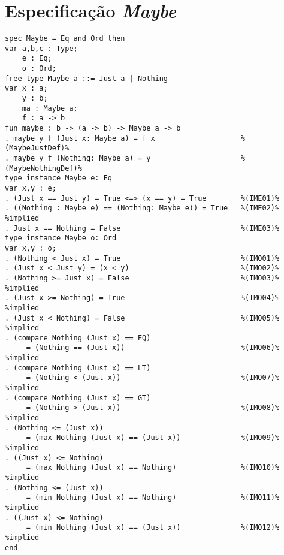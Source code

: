 \section{Especificação \textit{Maybe}}
\label{appendix:strictSpec:maybe}
\begin{Verbatim}
spec Maybe = Eq and Ord then
var a,b,c : Type;
    e : Eq;
    o : Ord;
free type Maybe a ::= Just a | Nothing
var x : a;
    y : b;
    ma : Maybe a;
    f : a -> b
fun maybe : b -> (a -> b) -> Maybe a -> b
. maybe y f (Just x: Maybe a) = f x                    %(MaybeJustDef)%
. maybe y f (Nothing: Maybe a) = y                     %(MaybeNothingDef)%
type instance Maybe e: Eq
var x,y : e; 
. (Just x == Just y) = True <=> (x == y) = True        %(IME01)%
. ((Nothing : Maybe e) == (Nothing: Maybe e)) = True   %(IME02)% %implied
. Just x == Nothing = False                            %(IME03)%
type instance Maybe o: Ord
var x,y : o;
. (Nothing < Just x) = True                            %(IMO01)%
. (Just x < Just y) = (x < y)                          %(IMO02)%
. (Nothing >= Just x) = False                          %(IMO03)% %implied
. (Just x >= Nothing) = True                           %(IMO04)% %implied
. (Just x < Nothing) = False                           %(IMO05)% %implied
. (compare Nothing (Just x) == EQ)
     = (Nothing == (Just x))                           %(IMO06)% %implied
. (compare Nothing (Just x) == LT)
     = (Nothing < (Just x))                            %(IMO07)% %implied
. (compare Nothing (Just x) == GT)
     = (Nothing > (Just x))                            %(IMO08)% %implied
. (Nothing <= (Just x))
     = (max Nothing (Just x) == (Just x))              %(IMO09)% %implied
. ((Just x) <= Nothing)
     = (max Nothing (Just x) == Nothing)               %(IMO10)% %implied
. (Nothing <= (Just x))
     = (min Nothing (Just x) == Nothing)               %(IMO11)% %implied
. ((Just x) <= Nothing)
     = (min Nothing (Just x) == (Just x))              %(IMO12)% %implied
end
\end{Verbatim}


